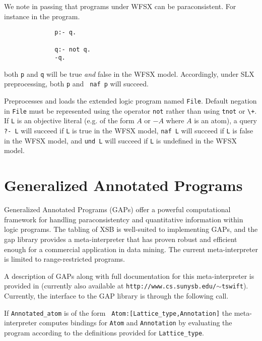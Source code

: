 We note in passing that programs under WFSX can be paraconsistent.
For instance in the program.
{\small
\begin{verbatim}
              p:- q.

              q:- not q.
              -q.
\end{verbatim}
}
both {\tt p} and {\tt q} will be true {\em and} false in the WFSX
model.  Accordingly, under SLX preprocessing, both {\tt p} and {\tt
naf p} will succeed.

\begin{description}
Preprocesses and loads the extended logic program named {\tt File}.
Default negation in {\tt File} must be represented using the operator
{\tt not} rather than using {\tt tnot} or \verb|\+|.  If {\tt L} is an
objective literal (e.g. of the form $A$ or $-A$ where $A$ is an atom),
a query {\tt ?- L} will succeed if {\tt L} is true in the WFSX model,
{\tt naf L} will succeed if {\tt L} is false in the WFSX model, and
{\tt und L} will succeed if {\tt L} is undefined in the WFSX model.
\end{description}


\section{Generalized Annotated Programs}  \label{library_utilities:gap}

Generalized Annotated Programs (GAPs) \cite{KiSu92} offer a powerful
computational framework for handling paraconsistentcy and quantitative
information within logic programs.  The tabling of XSB is well-suited
to implementing GAPs, and the gap library provides a meta-interpreter
that has proven robust and efficient enough for a commercial
application in data mining.  The current meta-interpreter is limited
to range-restricted programs.

A description of GAPs along with full documentation for this
meta-interpreter is provided in \cite{Swif99a} (currently also
available at {\tt http://www.cs.sunysb.edu/$\sim$tswift}).  Currently, the
interface to the GAP library is through the following call.

\begin{description}
%
If {\tt Annotated\_atom} is of the form {\tt
Atom:[Lattice\_type,Annotation]} the meta-interpreter computes bindings
for {\tt Atom} and {\tt Annotation} by evaluating the program
according to the definitions provided for {\tt Lattice\_type}.
\end{description}


